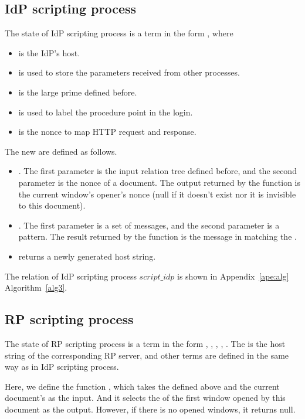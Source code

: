 \begin{appendices}
\subsection{IdP scripting process}
The state of IdP scripting process  is a term in the form , where
\begin{itemize}
\item {} is the IdP's host.
\item {} is used to store the parameters received from other processes.
\item {} is the large prime defined before.
\item {} is used to label the procedure point in the login.
\item {} is the nonce to map HTTP request and response.
\end{itemize}
 The new  are defined as follows.
 \begin{itemize}
 \item {}. The first parameter is the input relation tree defined before, and the second parameter is the nonce of a document. The output returned by the function is the current window's opener's nonce (null if it doesn't exist nor it is invisible to this document).
  \item {}. The first parameter is a set of messages, and the second parameter is a pattern. The result returned by the function is the message in  matching the .
  \item {} returns a newly generated host string.
 \end{itemize}
 The relation of IdP scripting process $script\_idp$ is shown in Appendix~\ref{ape:alg} Algorithm~\ref{alg3}.




\subsection{RP scripting process}
The state of RP scripting process  is a term in the form , , , , . The  is the host string of the corresponding RP server, and other terms are defined in the same way as in IdP scripting process.

Here, we define the function , which takes the  defined above and the current document's  as the input. And it selects the  of the first window opened by this document as the output. However, if there is no opened windows, it returns  null.


\end{appendices}
